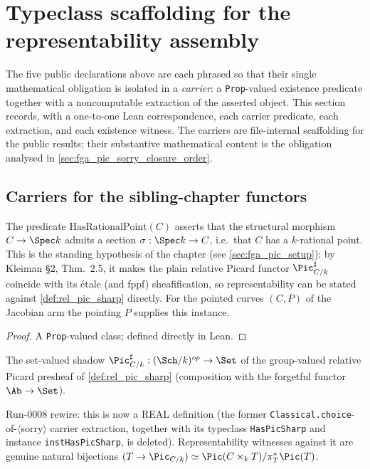 \section{Typeclass scaffolding for the representability assembly}
\label{sec:fga_pic_typeclass_scaffolding}

The five public declarations above are each phrased so that their single
mathematical obligation is isolated in a \emph{carrier}: a \texttt{Prop}-valued
existence predicate together with a noncomputable extraction of the asserted
object. This section records, with a one-to-one Lean correspondence, each
carrier predicate, each extraction, and each existence witness. The carriers
are file-internal scaffolding for the public results; their substantive
mathematical content is the obligation analysed in
\cref{sec:fga_pic_sorry_closure_order}.

\subsection{Carriers for the sibling-chapter functors}
\label{subsec:fga_pic_functor_carriers}

\begin{definition}
  \label{def:has_rational_point}
  The predicate \(\mathrm{HasRationalPoint}(C)\) asserts that the structural
  morphism \(C \to \Spec k\) admits a section
  \(\sigma : \Spec k \to C\), i.e.\ that \(C\) has a \(k\)-rational point.
  This is the standing hypothesis of the chapter (see
  \cref{sec:fga_pic_setup}): by Kleiman \S 2, Thm.~2.5, it makes the plain
  relative Picard functor \(\Pic^\sharp_{C/k}\) coincide with its \'etale
  (and fppf) sheafification, so representability can be stated against
  \cref{def:rel_pic_sharp} directly. For the pointed curves \((C, P)\) of
  the Jacobian arm the pointing \(P\) supplies this instance.
\end{definition}

\begin{proof}\leanok
  A \texttt{Prop}-valued class; defined directly in Lean.
\end{proof}

\begin{definition}
  \label{def:pic_sharp_carrier}
  The set-valued shadow \(\Pic^\sharp_{C/k} : (\Sch/k)^{op} \to \Set\) of the
  group-valued relative Picard presheaf of \cref{def:rel_pic_sharp}
  (composition with the forgetful functor \(\Ab \to \Set\)).

  Run-0008 rewire: this is now a REAL definition (the former
  \texttt{Classical.choice}-of-\(\langle\)sorry\(\rangle\) carrier
  extraction, together with its typeclass \texttt{HasPicSharp} and instance
  \texttt{instHasPicSharp}, is deleted). Representability witnesses against
  it are genuine natural bijections
  \((T \to \Pic_{C/k}) \simeq \Pic(C \times_k T)/\pi_T^*\Pic(T)\).
\end{definition}

